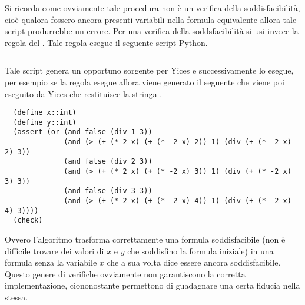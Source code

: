 \documentclass[11pt,letterpaper,twoside]{article}
\begin{document}
Si ricorda come ovviamente tale procedura non è un verifica della
soddisfacibilità, cioè qualora fossero ancora presenti variabili nella formula
equivalente allora tale script produrrebbe un errore. Per una verifica della
soddsfacibilità si usi invece la regola  del .
Tale regola esegue il seguente script Python\autocite{python}.

\inputminted[linenos]{python}{../sat.py}

Tale script genera un opportuno sorgente  per
Yices\autocite{yices} e successivamente lo esegue, per esempio se la regola
 esegue  allora viene generato il seguente  che viene poi
eseguito da Yices che restituisce la stringa .

\begin{verbatim}
  (define x::int)
  (define y::int)
  (assert (or (and false (div 1 3))
              (and (> (+ (* 2 x) (+ (* -2 x) 2)) 1) (div (+ (* -2 x) 2) 3))
              (and false (div 2 3))
              (and (> (+ (* 2 x) (+ (* -2 x) 3)) 1) (div (+ (* -2 x) 3) 3))
              (and false (div 3 3))
              (and (> (+ (* 2 x) (+ (* -2 x) 4)) 1) (div (+ (* -2 x) 4) 3))))
  (check)
\end{verbatim}

Ovvero l'algoritmo trasforma correttamente una formula soddisfacibile (non è
difficile trovare dei valori di $x$ e $y$ che soddisfino la formula iniziale) in
una formula senza la variabile $x$ che a sua volta  dice essere
ancora soddisfacibile. Questo genere di verifiche ovviamente non garantiscono la
corretta implementazione, ciononostante permettono di guadagnare una certa
fiducia nella stessa.


\newpage
\tableofcontents

\newpage \printbibliography
\end{document}
